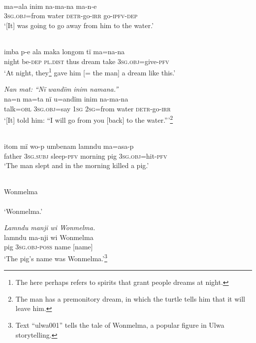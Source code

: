 \ex {}\\
\gll ma=ala     inim   na{{}-}ma{{}-}na     ma{{}-}n{{}-}e\\
3\textsc{sg.obj=}from  water  \textsc{detr-}go-\textsc{irr}  go-\textsc{ipfv-dep}\\
\glt ‘[It] was going to go {away from him} to the water.’

\ex {}\\
\gll imba{} p{{}-}e     ala       maka   longom  tï    ma{=}na-na\\
night  be-\textsc{dep}    \textsc{pl.dist}  thus  dream    take  3\textsc{sg.obj}=give-\textsc{pfv}\\
\glt ‘At night, they\footnote{The    here perhaps refers to spirits that grant people dreams at night.}{} gave him [= the man] a dream like this.’

\ex \negmedspace \textit{Nan mat: “Nï} {\textit{wandïm}} \textit{inim namana.”}\\
\gll na{=}n{} ma{=}ta      nï    {u=andïm} inim  na{{}-}ma{{}-}na\\
talk=\textsc{obl}  3\textsc{sg.obj}=say  1\textsc{sg}  2\textsc{sg}=from  water  \textsc{detr-}go-\textsc{irr}\\
\glt ‘[It] told him: “I will go {from you [back] to the wat}e{r}.”’\footnote{The man has a premonitory dream, in which the turtle tells him that it will leave him.}

\ex {}\\
\gll itom  mï       wo-p    umbenam  lamndu  ma=asa-p\\
father  3\textsc{sg.subj}  sleep-\textsc{pfv}  morning  pig      3\textsc{sg.obj}=hit-\textsc{pfv}\\
\glt ‘The man slept and in the morning killed a pig.’

\ex {}\\
\gll Wonmelma\\
[name]\\
\glt ‘Wonmelma.’

\ex \negmedspace \textit{Lamndu manji wi Wonmel}{\textit{m}}\textit{a.}\\
\gll lamndu  ma-nji      wi    Wonmel{m}a\\
pig      3\textsc{sg.obj-poss}  name  [name]\\
\glt ‘The pig’s name was Wonmelma.’\footnote{Text “ulwa001” tells the tale of Wonmelma, a popular figure in Ulwa storytelling.}

